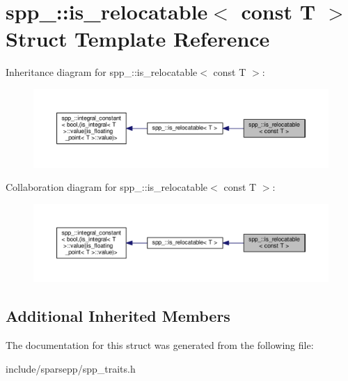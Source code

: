 \hypertarget{structspp___1_1is__relocatable_3_01const_01_t_01_4}{}\section{spp\+\_\+\+:\+:is\+\_\+relocatable$<$ const T $>$ Struct Template Reference}
\label{structspp___1_1is__relocatable_3_01const_01_t_01_4}


Inheritance diagram for spp\+\_\+\+:\+:is\+\_\+relocatable$<$ const T $>$\+:\nopagebreak
\begin{figure}[H]
\begin{center}
\leavevmode
\includegraphics[width=350pt]{structspp___1_1is__relocatable_3_01const_01_t_01_4__inherit__graph}
\end{center}
\end{figure}


Collaboration diagram for spp\+\_\+\+:\+:is\+\_\+relocatable$<$ const T $>$\+:\nopagebreak
\begin{figure}[H]
\begin{center}
\leavevmode
\includegraphics[width=350pt]{structspp___1_1is__relocatable_3_01const_01_t_01_4__coll__graph}
\end{center}
\end{figure}
\subsection*{Additional Inherited Members}


The documentation for this struct was generated from the following file\+:\begin{DoxyCompactItemize}
\item 
include/sparsepp/spp\+\_\+traits.\+h\end{DoxyCompactItemize}
